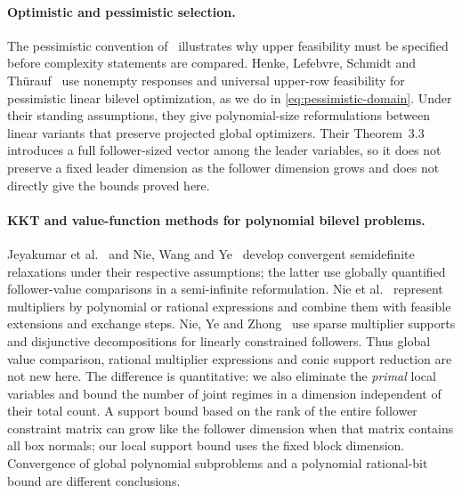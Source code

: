 \paragraph{Optimistic and pessimistic selection.}
The pessimistic convention of~\cite{KetkovProkopyev2026} illustrates why
upper feasibility must be specified before complexity statements are
compared. Henke, Lefebvre, Schmidt and Th\"urauf~\cite{HenkeEtAl2026} use
nonempty responses and universal upper-row feasibility for pessimistic
linear bilevel optimization, as we do in \eqref{eq:pessimistic-domain}.
Under their standing assumptions, they give polynomial-size reformulations
between linear variants that preserve projected global optimizers. Their
Theorem~3.3 introduces a full follower-sized vector among the leader
variables, so it does not preserve a fixed leader dimension as the follower
dimension grows and does not directly give the bounds proved here.

\paragraph{KKT and value-function methods for polynomial bilevel problems.}
Jeyakumar et al.~\cite{JeyakumarEtAl2016} and Nie, Wang and
Ye~\cite{NieWangYe2017} develop convergent semidefinite relaxations under
their respective assumptions; the latter use globally quantified
follower-value comparisons in a semi-infinite reformulation. Nie et
al.~\cite{NieEtAl2021} represent multipliers by polynomial or rational
expressions and combine them with feasible extensions and exchange steps.
Nie, Ye and Zhong~\cite{NieYeZhong2026} use sparse multiplier supports and
disjunctive decompositions for linearly constrained followers. Thus global
value comparison, rational multiplier expressions and conic support
reduction are not new here. The difference is quantitative: we also
eliminate the \emph{primal} local variables and bound the number of joint
regimes in a dimension independent of their total count. A support bound
based on the rank of the entire follower constraint matrix can grow like
the follower dimension when that matrix contains all box normals; our local
support bound uses the fixed block dimension. Convergence of global
polynomial subproblems and a polynomial rational-bit bound are different
conclusions.

